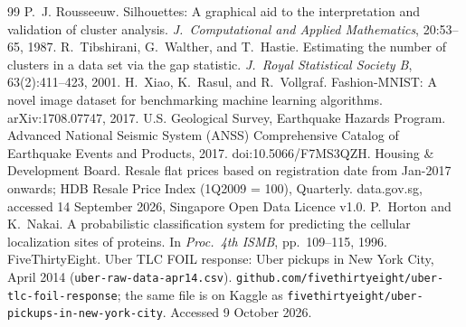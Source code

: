 \begin{thebibliography}{99}
 P.~J. Rousseeuw. Silhouettes: A graphical aid to the interpretation and validation of cluster analysis. \emph{J.\ Computational and Applied Mathematics}, 20:53--65, 1987.
 R.~Tibshirani, G.~Walther, and T.~Hastie. Estimating the number of clusters in a data set via the gap statistic. \emph{J.\ Royal Statistical Society B}, 63(2):411--423, 2001.
 H.~Xiao, K.~Rasul, and R.~Vollgraf. Fashion-MNIST: A novel image dataset for benchmarking machine learning algorithms. arXiv:1708.07747, 2017.
 U.S. Geological Survey, Earthquake Hazards Program. Advanced National Seismic System (ANSS) Comprehensive Catalog of Earthquake Events and Products, 2017. doi:10.5066/F7MS3QZH.
 Housing \& Development Board. Resale flat prices based on registration date from Jan-2017 onwards; HDB Resale Price Index (1Q2009 = 100), Quarterly. data.gov.sg, accessed 14 September 2026, Singapore Open Data Licence v1.0.
 
 P.~Horton and K.~Nakai. A probabilistic classification system for predicting the cellular localization sites of proteins. In \emph{Proc.\ 4th ISMB}, pp.~109--115, 1996.
 FiveThirtyEight. Uber TLC FOIL response: Uber pickups in New York City, April 2014 (\texttt{uber-raw-data-apr14.csv}). \texttt{github.com/fivethirtyeight/uber-tlc-foil-response}; the same file is on Kaggle as \texttt{fivethirtyeight/uber-pickups-in-new-york-city}. Accessed 9 October 2026.
\end{thebibliography}
